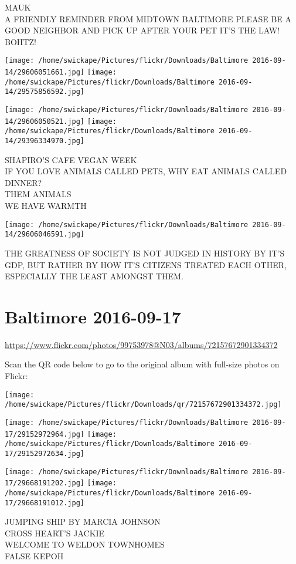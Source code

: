 \documentclass[10pt,letterpaper]{article}
\begin{document}
MAUK\\
A FRIENDLY REMINDER FROM MIDTOWN BALTIMORE PLEASE BE A GOOD NEIGHBOR AND PICK UP AFTER YOUR PET IT'S THE LAW!\\
BOHTZ!
\pagebreak

\texttt{[image: /home/swickape/Pictures/flickr/Downloads/Baltimore 2016-09-14/29606051661.jpg]}
\texttt{[image: /home/swickape/Pictures/flickr/Downloads/Baltimore 2016-09-14/29575856592.jpg]}

\texttt{[image: /home/swickape/Pictures/flickr/Downloads/Baltimore 2016-09-14/29606050521.jpg]}
\texttt{[image: /home/swickape/Pictures/flickr/Downloads/Baltimore 2016-09-14/29396334970.jpg]}

SHAPIRO'S CAFE VEGAN WEEK\\
IF YOU LOVE ANIMALS CALLED PETS, WHY EAT ANIMALS CALLED DINNER?\\
THEM ANIMALS\\
WE HAVE WARMTH
\pagebreak

\texttt{[image: /home/swickape/Pictures/flickr/Downloads/Baltimore 2016-09-14/29606046591.jpg]}

THE GREATNESS OF SOCIETY IS NOT JUDGED IN HISTORY BY IT'S GDP, BUT RATHER BY HOW IT'S CITIZENS TREATED EACH OTHER, ESPECIALLY THE LEAST AMONGST THEM.
\pagebreak

\section*{Baltimore 2016-09-17}

\url{https://www.flickr.com/photos/99753978@N03/albums/72157672901334372}

Scan the QR code below to go to the original album with full-size photos on Flickr:

\texttt{[image: /home/swickape/Pictures/flickr/Downloads/qr/72157672901334372.jpg]}
\pagebreak

\texttt{[image: /home/swickape/Pictures/flickr/Downloads/Baltimore 2016-09-17/29152972964.jpg]}
\texttt{[image: /home/swickape/Pictures/flickr/Downloads/Baltimore 2016-09-17/29152972634.jpg]}

\texttt{[image: /home/swickape/Pictures/flickr/Downloads/Baltimore 2016-09-17/29668191202.jpg]}
\texttt{[image: /home/swickape/Pictures/flickr/Downloads/Baltimore 2016-09-17/29668191012.jpg]}

JUMPING SHIP BY MARCIA JOHNSON\\
CROSS HEART'S JACKIE\\
WELCOME TO WELDON TOWNHOMES\\
FALSE KEPOH
\pagebreak
\end{document}
